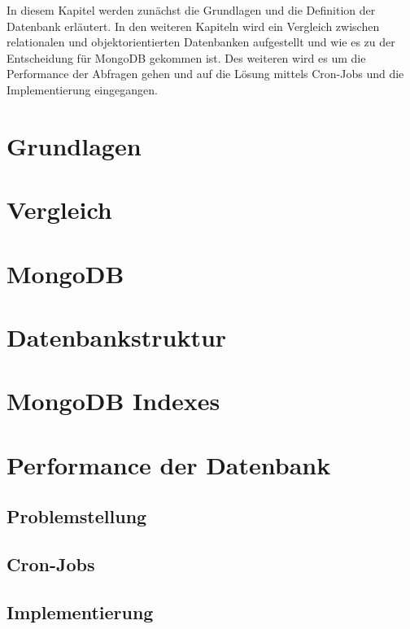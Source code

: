 In diesem Kapitel werden zunächst die Grundlagen und die Definition der Datenbank erläutert. In den weiteren Kapiteln wird ein Vergleich zwischen relationalen und objektorientierten Datenbanken aufgestellt und wie es zu der Entscheidung für MongoDB gekommen ist. Des weiteren wird es um die Performance der Abfragen gehen und auf die Lösung mittels Cron-Jobs und die Implementierung eingegangen.

\section{Grundlagen}


\section{Vergleich}


\section{MongoDB}


\section{Datenbankstruktur}


\section{MongoDB Indexes}


\section{Performance der Datenbank}


\subsection{Problemstellung}


\subsection{Cron-Jobs}


\subsection{Implementierung}
